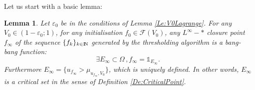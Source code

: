 \documentclass{article}
\newcommand{\N}{\textnormal{I\kern-0.21emN}}
\def\e{{\varepsilon}}
\newtheorem{lemma}[material]{Lemma}
\def\O{{\Omega}}
\numberwithin{equation}{section}
\begin{document}
Let us start with a basic lemma:
\begin{lemma}\label{Le:ClosurePointBgbg} Let $\e_0$ be in the conditions of Lemma \ref{Le:V0Lagrange}. For any $V_0\in (1-\e_0;1)$, for any initialisation $f_0\in \mathcal F(V_0)$, any $L^\infty-*$ closure point $f_\infty$ of the sequence $\{f_k\}_{k\in \N}$ generated by the thresholding algorithm is a bang-bang function:
\begin{equation}\exists E_\infty\subset \O\,, f_\infty=\mathds 1_{E_\infty}.\end{equation} Furthermore $E_\infty=\{u_{f_\infty}>\mu_{u_{f_\infty},V_0}\}$, which is uniquely defined. In other words, $E_\infty$ is a critical set in the sense of Definition \ref{De:CriticalPoint}.

\end{lemma}
\end{document}
